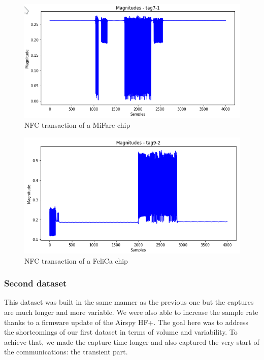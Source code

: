 \begin{figure}[htbp!]
  \centering
  \includegraphics[scale=0.65]{figures/data_magnitudes_Mifare.png}
  \caption{NFC transaction of a MiFare chip}
  \label{fig:mifare}
\end{figure}

\begin{figure}[htbp!]
  \centering
  \includegraphics[scale=0.65]{figures/data_magnitudes_FeliCa.png}
  \caption{NFC transaction of a FeliCa chip}
  \label{fig:felica}
\end{figure}

\newpage
\subsubsection{Second dataset}

This dataset was built in the same manner as the previous one but the captures are much longer and more variable. We were also able to increase the sample rate thanks to a firmware update of the Airspy HF+. The goal here was to address the shortcomings of our first dataset in terms of volume and variability. To achieve that, we made the capture time longer and also captured the very start of the communications: the transient part.

